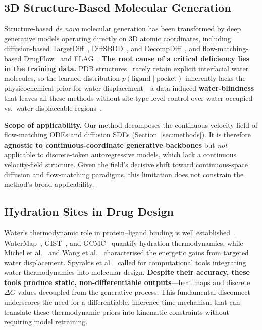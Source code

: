\documentclass{article}
\begin{document}
\subsection{3D Structure-Based Molecular Generation}

Structure-based \emph{de novo} molecular generation has been transformed by
deep generative models operating directly on 3D atomic coordinates,
including diffusion-based TargetDiff~\cite{guan2023targetdiff},
DiffSBDD~\cite{schneuing2024diffsbdd}, and
DecompDiff~\cite{guan2023decompdiff}, and flow-matching-based
DrugFlow~\cite{drugflow2024} and FLAG~\cite{zhang2024flag}.
\textbf{The root cause of a critical deficiency lies in the training data.}
PDB structures~\cite{berman2000pdb} rarely retain explicit interfacial
water molecules, so the learned distribution $p(\text{ligand} \mid
\text{pocket})$ inherently lacks the physicochemical prior for water
displacement---a data-induced \textbf{water-blindness} that leaves all
these methods without site-type-level control over water-occupied vs.\
water-displaceable regions~\cite{abel2008,michel2009}.

\textbf{Scope of applicability.}
Our method decomposes the continuous velocity field of flow-matching ODEs
and diffusion SDEs (Section~\ref{sec:methods}).  It is therefore
\textbf{agnostic to continuous-coordinate generative backbones} but
\emph{not} applicable to discrete-token autoregressive models, which lack
a continuous velocity-field structure.  Given the field's decisive shift
toward continuous-space diffusion and flow-matching paradigms, this
limitation does not constrain the method's broad applicability.

\subsection{Hydration Sites in Drug Design}

Water's thermodynamic role in protein--ligand binding is well
established~\cite{dunitz1994,ladbury1996}.  WaterMap~\cite{abel2008},
GIST~\cite{nguyen2012gist}, and GCMC~\cite{ross2012gcmc} quantify
hydration thermodynamics, while Michel et al.~\cite{michel2009} and Wang
et al.~\cite{wang2015water} characterised the energetic gains from
targeted water displacement.  Spyrakis et al.~\cite{spyrakis2017} called
for computational tools integrating water thermodynamics into molecular
design.  \textbf{Despite their accuracy, these tools produce static,
non-differentiable outputs}---heat maps and discrete $\Delta G$ values
decoupled from the generative process.  This fundamental disconnect
underscores the need for a differentiable, inference-time mechanism that
can translate these thermodynamic priors into kinematic constraints
without requiring model retraining.
\end{document}
